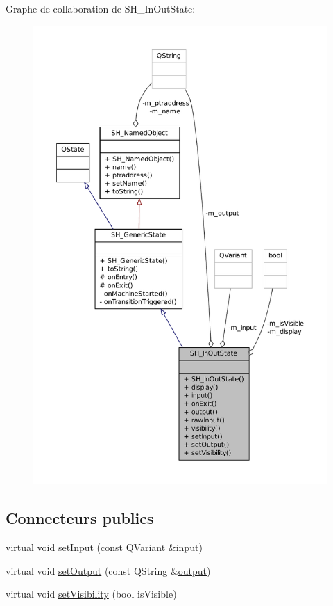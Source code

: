 Graphe de collaboration de S\-H\-\_\-\-In\-Out\-State\-:\nopagebreak
\begin{figure}[H]
\begin{center}
\leavevmode
\includegraphics[width=350pt]{classSH__InOutState__coll__graph}
\end{center}
\end{figure}
\subsection*{Connecteurs publics}
\begin{DoxyCompactItemize}
\item 
virtual void \hyperlink{classSH__InOutState_a0206ab7d5616f28b0da7bfd5451614e8}{set\-Input} (const Q\-Variant \&\hyperlink{classSH__InOutState_a04364c76d2fd8a3781e7b325955e5bd9}{input})
\item 
virtual void \hyperlink{classSH__InOutState_a7dc244d72e09fdbc30eb3a704b05a4d8}{set\-Output} (const Q\-String \&\hyperlink{classSH__InOutState_a1a2fd4f34484125058e20730aaee7e46}{output})
\item 
virtual void \hyperlink{classSH__InOutState_a7706a2ea1367ab3416db27fa0f4794f7}{set\-Visibility} (bool is\-Visible)
\end{DoxyCompactItemize}
